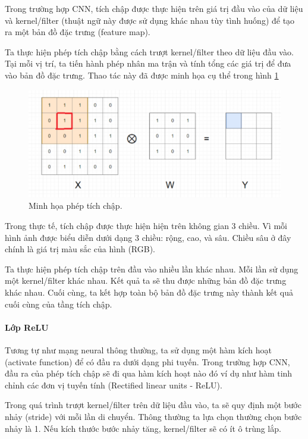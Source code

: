 Trong trường hợp CNN, tích chập được thực hiện trên giá trị đầu vào của dữ liệu và kernel/filter (thuật ngữ này được sử dụng khác nhau tùy tình huống) để tạo ra một bản đồ đặc trưng (feature map). 

Ta thực hiện phép tích chập bằng cách trượt kernel/filter theo dữ liệu đầu vào. Tại mỗi vị trí, ta tiến hành phép nhân ma trận và tính tổng các giá trị để đưa vào bản đồ đặc trưng. Thao tác này đã được minh họa cụ thể trong hình \ref{fig:padding18}

\begin{figure}[H]
	\centering
	\includegraphics[width=1\linewidth]{images/padding18.png}
	\caption{Minh họa phép tích chập.}
	\label{fig:padding18}
\end{figure}

Trong thực tế, tích chập được thực hiện hiện trên không gian 3 chiều. Vì mỗi hình ảnh được biểu diễn dưới dạng 3 chiều: rộng, cao, và sâu. Chiều sâu ở đây chính là giá trị màu sắc của hình (RGB).

Ta thực hiện phép tích chập trên đầu vào nhiều lần khác nhau. Mỗi lần sử dụng một kernel/filter khác nhau. Kết quả ta sẽ thu được những bản đồ đặc trưng khác nhau. Cuối cùng, ta kết hợp toàn bộ bản đồ đặc trưng này thành kết quả cuối cùng của tầng tích chập.

\paragraph{Lớp ReLU}

Tương tự như mạng neural thông thường, ta sử dụng một hàm kích hoạt (activate function) để có đầu ra dưới dạng phi tuyến. Trong trường hợp CNN, đầu ra của phép tích chập sẽ đi qua hàm kích hoạt nào đó ví dụ như hàm tinh chỉnh các đơn vị tuyến tính (Rectified linear units - ReLU). 

Trong quá trình trượt kernel/filter trên dữ liệu đầu vào, ta sẽ quy định một bước nhảy (stride) với mỗi lần di chuyển. Thông thường ta lựa chọn thường chọn bước nhảy là 1. Nếu kích thước bước nhảy tăng, kernel/filter sẽ có ít ô trùng lắp.

